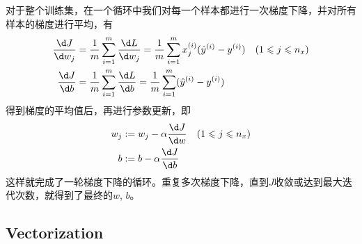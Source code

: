 对于整个训练集，在一个循环中我们对每一个样本都进行一次梯度下降，并对所有样本的梯度进行平均，有
\begin{equation}
    \begin{aligned}
        \frac{\d J}{\d w_j} &= \frac{1}{m} \sum_{i=1}^{m} \frac{\d L}{\d w_j} = \frac{1}{m} \sum_{i=1}^{m} x_j^{(i)} (\hat{y}^{(i)} - y^{(i)}) \quad (1 \leqslant j \leqslant n_x)\\
        \frac{\d J}{\d b} &= \frac{1}{m} \sum_{i=1}^{m} \frac{\d L}{\d b} = \frac{1}{m} \sum_{i=1}^{m} (\hat{y}^{(i)} - y^{(i)})
    \end{aligned}
\end{equation}
得到梯度的平均值后，再进行参数更新，即
\begin{equation}
    \begin{aligned}
    w_j &:= w_j - \alpha \frac{\d J}{\d w} \quad (1 \leqslant j \leqslant n_x) \\
    b &:= b - \alpha \frac{\d J}{\d b}
    \end{aligned} 
\end{equation}
这样就完成了一轮梯度下降的循环。重复多次梯度下降，直到$J$收敛或达到最大迭代次数，就得到了最终的$w$, $b$。

\subsection{Vectorization}

